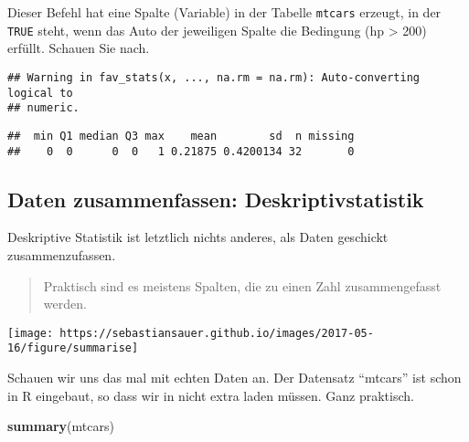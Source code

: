 \documentclass[]{article}
\newenvironment{Shaded}{\begin{snugshade}}{\end{snugshade}}
\newcommand{\KeywordTok}[1]{\textcolor[rgb]{0.13,0.29,0.53}{\textbf{#1}}}
\newcommand{\NormalTok}[1]{#1}
\newcommand{\OperatorTok}[1]{\textcolor[rgb]{0.81,0.36,0.00}{\textbf{#1}}}
\begin{document}
Dieser Befehl hat eine Spalte (Variable) in der Tabelle \texttt{mtcars}
erzeugt, in der \texttt{TRUE} steht, wenn das Auto der jeweiligen Spalte
die Bedingung (hp \textgreater{} 200) erfüllt. Schauen Sie nach.

\begin{Shaded}
\end{Shaded}

\begin{verbatim}
## Warning in fav_stats(x, ..., na.rm = na.rm): Auto-converting logical to
## numeric.
\end{verbatim}

\begin{verbatim}
##  min Q1 median Q3 max    mean        sd  n missing
##    0  0      0  0   1 0.21875 0.4200134 32       0
\end{verbatim}

\hypertarget{daten-zusammenfassen-deskriptivstatistik}{%
\subsection{Daten zusammenfassen:
Deskriptivstatistik}\label{daten-zusammenfassen-deskriptivstatistik}}

Deskriptive Statistik ist letztlich nichts anderes, als Daten geschickt
zusammenzufassen.

\begin{quote}
Praktisch sind es meistens Spalten, die zu einen Zahl zusammengefasst
werden.
\end{quote}

\begin{center}\texttt{[image: https://sebastiansauer.github.io/images/2017-05-16/figure/summarise]} \end{center}

Schauen wir uns das mal mit echten Daten an. Der Datensatz ``mtcars''
ist schon in R eingebaut, so dass wir in nicht extra laden müssen. Ganz
praktisch.

\begin{Shaded}
\begin{Highlighting}[]
\KeywordTok{summary}\NormalTok{(mtcars)}
\end{Highlighting}
\end{Shaded}
\end{document}
